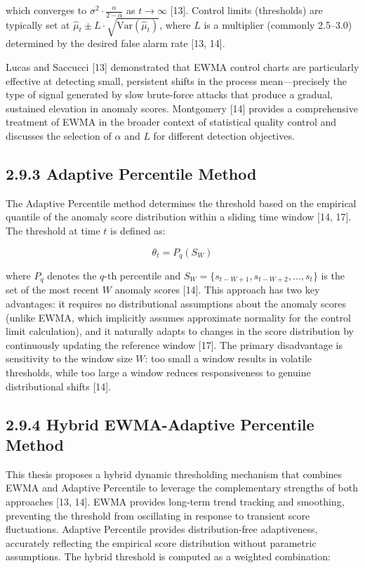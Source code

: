 \documentclass[
  a4paper]{report}
\begin{document}
which converges to \(\sigma^2 \cdot \frac{\alpha}{2 - \alpha}\) as
\(t \to \infty\) {[}13{]}. Control limits (thresholds) are typically set
at \(\hat{\mu}_t \pm L \cdot \sqrt{\text{Var}(\hat{\mu}_t)}\), where
\(L\) is a multiplier (commonly 2.5--3.0) determined by the desired
false alarm rate {[}13, 14{]}.

Lucas and Saccucci {[}13{]} demonstrated that EWMA control charts are
particularly effective at detecting small, persistent shifts in the
process mean---precisely the type of signal generated by slow
brute-force attacks that produce a gradual, sustained elevation in
anomaly scores. Montgomery {[}14{]} provides a comprehensive treatment
of EWMA in the broader context of statistical quality control and
discusses the selection of \(\alpha\) and \(L\) for different detection
objectives.

\subsection{2.9.3 Adaptive Percentile
Method}\label{adaptive-percentile-method}

The Adaptive Percentile method determines the threshold based on the
empirical quantile of the anomaly score distribution within a sliding
time window {[}14, 17{]}. The threshold at time \(t\) is defined as:

\[\theta_t = P_q(S_W)\]

where \(P_q\) denotes the \(q\)-th percentile and
\(S_W = \{s_{t-W+1}, s_{t-W+2}, \ldots, s_t\}\) is the set of the most
recent \(W\) anomaly scores {[}14{]}. This approach has two key
advantages: it requires no distributional assumptions about the anomaly
scores (unlike EWMA, which implicitly assumes approximate normality for
the control limit calculation), and it naturally adapts to changes in
the score distribution by continuously updating the reference window
{[}17{]}. The primary disadvantage is sensitivity to the window size
\(W\): too small a window results in volatile thresholds, while too
large a window reduces responsiveness to genuine distributional shifts
{[}14{]}.

\subsection{2.9.4 Hybrid EWMA-Adaptive Percentile
Method}\label{hybrid-ewma-adaptive-percentile-method}

This thesis proposes a hybrid dynamic thresholding mechanism that
combines EWMA and Adaptive Percentile to leverage the complementary
strengths of both approaches {[}13, 14{]}. EWMA provides long-term trend
tracking and smoothing, preventing the threshold from oscillating in
response to transient score fluctuations. Adaptive Percentile provides
distribution-free adaptiveness, accurately reflecting the empirical
score distribution without parametric assumptions. The hybrid threshold
is computed as a weighted combination:
\end{document}
